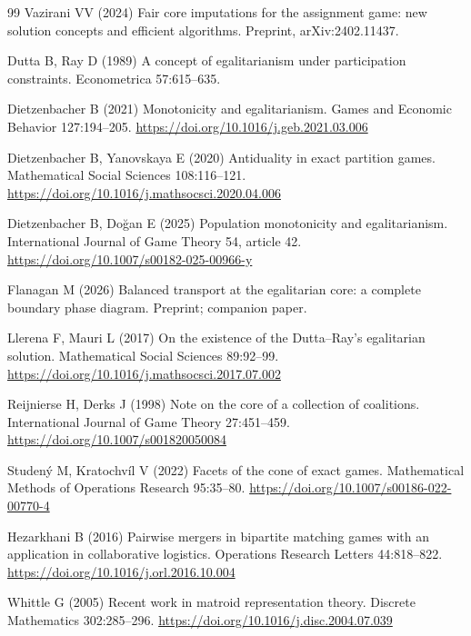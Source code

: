 \documentclass[11pt]{article}
\begin{document}
{\begin{thebibliography}{99}
Vazirani VV (2024) Fair core imputations for the assignment game: new
solution concepts and efficient algorithms. Preprint, arXiv:2402.11437.

Dutta B, Ray D (1989) A concept of egalitarianism under participation
constraints. Econometrica 57:615--635.

Dietzenbacher B (2021) Monotonicity and egalitarianism.
Games and Economic Behavior 127:194--205.
\url{https://doi.org/10.1016/j.geb.2021.03.006}

Dietzenbacher B, Yanovskaya E (2020) Antiduality in exact partition games.
Mathematical Social Sciences 108:116--121.
\url{https://doi.org/10.1016/j.mathsocsci.2020.04.006}

Dietzenbacher B, Do\u{g}an E (2025) Population monotonicity and egalitarianism.
International Journal of Game Theory 54, article 42.
\url{https://doi.org/10.1007/s00182-025-00966-y}

Flanagan M (2026) Balanced transport at the egalitarian core: a complete
boundary phase diagram. Preprint; companion paper.

Llerena F, Mauri L (2017) On the existence of the Dutta--Ray's egalitarian
solution. Mathematical Social Sciences 89:92--99.
\url{https://doi.org/10.1016/j.mathsocsci.2017.07.002}

Reijnierse H, Derks J (1998) Note on the core of a collection of coalitions.
International Journal of Game Theory 27:451--459.
\url{https://doi.org/10.1007/s001820050084}

Studen\'y M, Kratochv\'il V (2022) Facets of the cone of exact games.
Mathematical Methods of Operations Research 95:35--80.
\url{https://doi.org/10.1007/s00186-022-00770-4}

Hezarkhani B (2016) Pairwise mergers in bipartite matching games with an
application in collaborative logistics. Operations Research Letters
44:818--822.
\url{https://doi.org/10.1016/j.orl.2016.10.004}

Whittle G (2005) Recent work in matroid representation theory.
Discrete Mathematics 302:285--296.
\url{https://doi.org/10.1016/j.disc.2004.07.039}


\end{thebibliography}}
\end{document}
